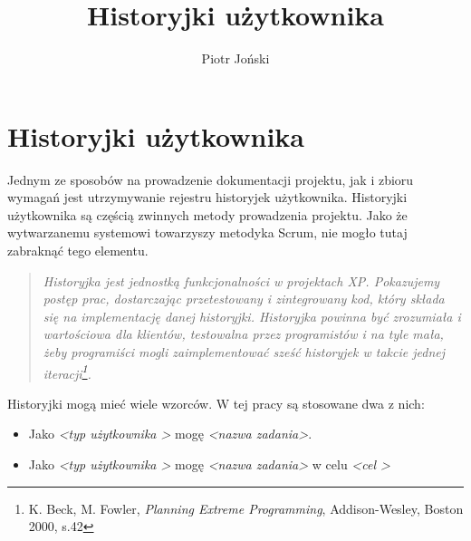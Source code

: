 \documentclass[a4paper,11pt]{article}
\author{Piotr Joński}
\title{Historyjki użytkownika}
\newenvironment{italicquote}
{\begin{quote}\itshape}
{\end{quote}}
\begin{document}
\maketitle
\tableofcontents 
\newpage

\section{Historyjki użytkownika}
Jednym ze sposobów na prowadzenie dokumentacji projektu, jak i zbioru wymagań jest utrzymywanie rejestru historyjek użytkownika. Historyjki użytkownika są częścią zwinnych metody prowadzenia projektu. Jako że wytwarzanemu systemowi towarzyszy metodyka Scrum, nie mogło tutaj zabraknąć tego elementu.

\begin{italicquote}
	Historyjka jest jednostką funkcjonalności w projektach XP. Pokazujemy postęp prac, dostarczając przetestowany i zintegrowany kod, który składa się na implementację danej historyjki. Historyjka powinna być zrozumiała i wartościowa dla klientów, testowalna przez programistów i na tyle mała, żeby programiści mogli zaimplementować sześć historyjek w takcie jednej iteracji\footnote{K. Beck, M. Fowler, \textit{Planning Extreme Programming}, Addison-Wesley, Boston 2000, s.42}.
\end{italicquote}

Historyjki mogą mieć wiele wzorców. W tej pracy są stosowane dwa z nich:
\begin{itemize}
	\item Jako \textit{\textless typ użytkownika \textgreater} mogę \textit{\textless nazwa zadania\textgreater}.
	\item Jako \textit{\textless typ użytkownika \textgreater} mogę \textit{\textless nazwa zadania\textgreater} w celu \textit{\textless cel \textgreater}\cite{SCRUM}
\end{itemize} 
\end{document}
